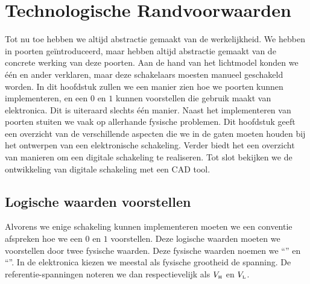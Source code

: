 \chapter{Technologische Randvoorwaarden}
\begin{chapterintro}
Tot nu toe hebben we altijd abstractie gemaakt van de werkelijkheid. We hebben in  poorten ge\"introduceerd, maar hebben altijd abstractie gemaakt van de concrete werking van deze poorten. Aan de hand van het lichtmodel konden we \'e\'en en ander verklaren, maar deze schakelaars moesten manueel geschakeld worden. In dit hoofdstuk zullen we een manier zien hoe we poorten kunnen implementeren, en een $0$ en $1$ kunnen voorstellen die gebruik maakt van elektronica. Dit is uiteraard slechts \'e\'en manier. Naast het implementeren van poorten stuiten we vaak op allerhande fysische problemen. Dit hoofdstuk geeft een overzicht van de verschillende aspecten die we in de gaten moeten houden bij het ontwerpen van een elektronische schakeling. Verder biedt het een overzicht van manieren om een digitale schakeling te realiseren. Tot slot bekijken we de ontwikkeling van digitale schakeling met een CAD tool.
\end{chapterintro}
\minitoc[n]
\section{Logische waarden voorstellen}
Alvorens we enige schakeling kunnen implementeren moeten we een conventie afspreken hoe we een $0$ en $1$ voorstellen. Deze logische waarden moeten we voorstellen door twee fysische waarden. Deze fysische waarden noemen we ``'' en ``''. In de elektronica kiezen we meestal als fysische grootheid de spanning. De referentie-spanningen noteren we dan respectievelijk als $V_{\mbox{\tiny H}}$ en $V_{\mbox{\tiny L}}$.

